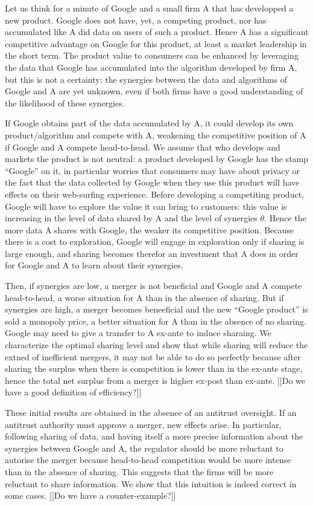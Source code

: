 \documentclass[a4paper,leqno]{article}%
\renewcommand{\t}{\theta}
\renewcommand{\t}{\theta}
\begin{document}
Let us think for a minute of Google and a small firm A that has developped a new product. Google does not have, yet, a competing product, nor has accumulated like A did data on users of such a product. Hence A has a significant competitive advantage on Google for this product, at least a market leadership in the short term. The product value to consumers can be enhanced by leveraging the data that Google has accumulated into the algorithm developed by firm A, but this is not a certainty: the synergies between the data and algorithms of Google and A are yet unknown, even if both firms have a good understanding of the likelihood of these synergies. 

If Google obtains part of the data accumulated by A, it could develop its own product/algorithm and compete with A, weakening the competitive position of A if Google and A compete head-to-head. We assume that who develops and markets the product is not neutral: a product developed by Google has the stamp ``Google'' on it, in particular worries that consumers may have about privacy or the fact that the data collected by Google when they use this product will have effects on their web-surfing experience. Before developing a competiting product, Google will have to explore the value it can bring to customers: this value is increasing in the level of data shared by A and the level of synergies $\t$. Hence the more data A shares with Google, the weaker its competitive position. Because there is a cost to exploration, Google will engage in exploration only if sharing is large enough, and sharing becomes therefor an investment that A does in order for Google and A to learn about their synergies.

Then, if synergies are low, a merger is not beneficial and Google and A compete head-to-head, a worse situation for A than in the absence of sharing. But if synergies are high, a merger becomes beneeficial and the new ``Google product'' is sold a monopoly price, a better situation for A than in the absence of no sharing. Google may need to give a transfer to A ex-ante to induce sharaing. We characterize the optimal sharing level and show that while sharing will reduce the extned of inefficient mergers, it may not be able to do so perfectly because after sharing the surplus when there is competition is lower than in the ex-ante stage, hence the total net surplus from a merger is higher ex-post than ex-ante. [[Do we have a good definition of efficiency?]]

These initial results are obtained in the absence of an antitrust oversight. If an antitrust authority must approve a merger, new effects arise. In particular, following sharing of data, and having itself a more precise information about the synergies between Google and A, the regulator should be more reluctant to autorise the merger because head-to-head competition would be more intense than in the absence of sharing. This suggests that the firms will be more reluctant to share information. We show that this intuition is indeed correct in some cases. [[Do we have a counter-example?]]
\end{document}
